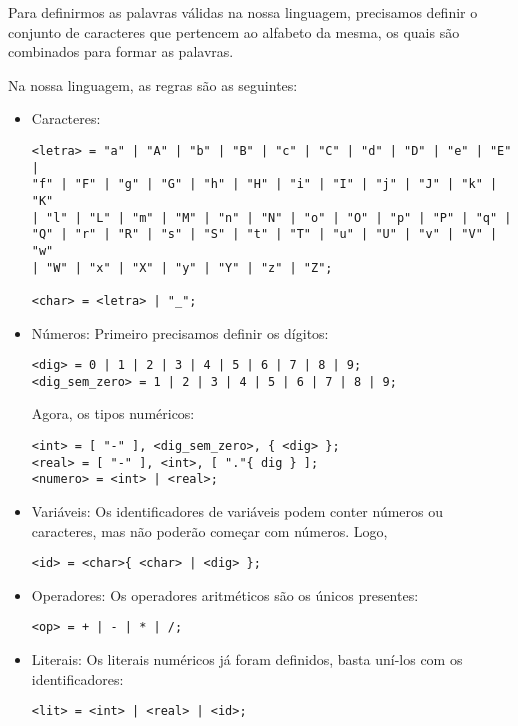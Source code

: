 \documentclass[a4 paper, 12pt]{article}
\begin{document}
Para definirmos as palavras v\'alidas na nossa linguagem, precisamos
definir o conjunto de caracteres que pertencem ao alfabeto da mesma,
os quais s\~ao combinados para formar as palavras.

Na nossa linguagem, as regras s\~ao as seguintes:
\begin{itemize}
\item Caracteres:
\begin{verbatim}
<letra> = "a" | "A" | "b" | "B" | "c" | "C" | "d" | "D" | "e" | "E" |
"f" | "F" | "g" | "G" | "h" | "H" | "i" | "I" | "j" | "J" | "k" | "K"
| "l" | "L" | "m" | "M" | "n" | "N" | "o" | "O" | "p" | "P" | "q" |
"Q" | "r" | "R" | "s" | "S" | "t" | "T" | "u" | "U" | "v" | "V" | "w"
| "W" | "x" | "X" | "y" | "Y" | "z" | "Z";

<char> = <letra> | "_";
\end{verbatim}

\item N\'umeros:
Primeiro precisamos definir os d\'igitos:
\begin{verbatim}
<dig> = 0 | 1 | 2 | 3 | 4 | 5 | 6 | 7 | 8 | 9;
<dig_sem_zero> = 1 | 2 | 3 | 4 | 5 | 6 | 7 | 8 | 9;
\end{verbatim}

Agora, os tipos num\'ericos:

\begin{verbatim}
<int> = [ "-" ], <dig_sem_zero>, { <dig> };
<real> = [ "-" ], <int>, [ "."{ dig } ];
<numero> = <int> | <real>;
\end{verbatim}

\item Vari\'aveis:
Os identificadores de vari\'aveis podem conter n\'umeros ou
caracteres, mas n\~ao poder\~ao come\c car com n\'umeros. Logo,
\begin{verbatim}
<id> = <char>{ <char> | <dig> };
\end{verbatim}

\item Operadores:
Os operadores aritm\'eticos s\~ao os \'unicos presentes:
\begin{verbatim}
<op> = + | - | * | /;
\end{verbatim}

\item Literais:
Os literais num\'ericos j\'a foram definidos, basta un\'i-los com os
identificadores:
\begin{verbatim}
<lit> = <int> | <real> | <id>;
\end{verbatim}
\end{itemize}
\end{document}
